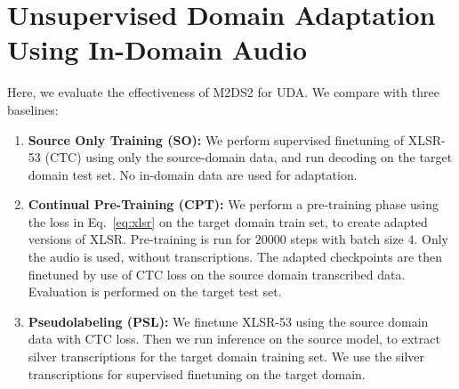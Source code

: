 \documentclass[journal]{IEEEtran}
\begin{document}
\section{Unsupervised Domain Adaptation Using In-Domain Audio}
\label{sec:experiments}

Here, we evaluate the effectiveness of M2DS2 for UDA. We compare with three baselines:
\begin{enumerate}
    \item \textbf{Source Only Training (SO):} We perform supervised finetuning of XLSR-53 (CTC) using only the source-domain data, and run decoding on the target domain test set. No in-domain data are used for adaptation.
    \item \textbf{Continual Pre-Training (CPT):} We perform a pre-training phase using the loss in Eq.~\eqref{eq:xlsr} on the target domain train set, to create adapted versions of XLSR. Pre-training is run for $20000$ steps with batch size $4$. Only the audio is used, without transcriptions. The adapted checkpoints are then finetuned by use of CTC loss on the source domain transcribed data. Evaluation is performed on the target test set.
    \item \textbf{Pseudolabeling (PSL):} We finetune XLSR-53 using the source domain data with CTC loss. Then we run inference on the source model, to extract silver transcriptions for the target domain training set. We use the silver transcriptions for supervised finetuning on the target domain.
\end{enumerate}
\end{document}
